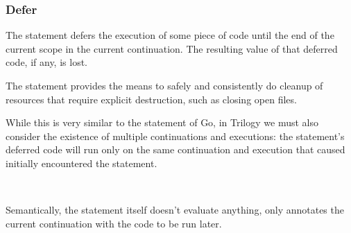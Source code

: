 \subsubsection{Defer}
\label{sec:prose-defer}

The  statement defers the execution of some piece of code until the
end of the current scope in the current continuation. The resulting value of
that deferred code, if any, is lost.

The  statement provides the means to safely and consistently do cleanup
of resources that require explicit destruction, such as closing open files.

While this is very similar to the  statement of Go, in Trilogy we must
also consider the existence of multiple continuations and executions: the 
statement's deferred code will run only on the same continuation and execution that
caused initially encountered the  statement.

\begin{bnf*}
     \\
\end{bnf*}

Semantically, the  statement itself doesn't evaluate anything, only annotates
the current continuation with the code to be run later.

\begin{prooftree}
\end{prooftree}

